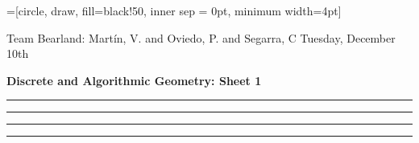 \documentclass[a4paper, 10pt]{article}
\theoremstyle{definition} %
\begin{document}
\onehalfspacing
{}=[circle, draw, fill=black!50, inner sep = 0pt, minimum width=4pt]

Team Bearland: Mart\'in, V. and Oviedo, P. and Segarra, C \hfill Tuesday, December 10th

\vspace{15pt}

\textbf{\Large Discrete and Algorithmic Geometry: Sheet 1}

\vspace{20pt}



\vspace{5pt}

\begin{center}
    \rule{5cm}{0.4pt}
\end{center}

\vspace{5pt}



\vspace{5pt}

\begin{center}
    \rule{5cm}{0.4pt}
\end{center}

\vspace{5pt}



\vspace{5pt}

\begin{center}
    \rule{5cm}{0.4pt}
\end{center}

\vspace{5pt}



\vspace{5pt}

\begin{center}
    \rule{5cm}{0.4pt}
\end{center}

\vspace{5pt}
\end{document}

